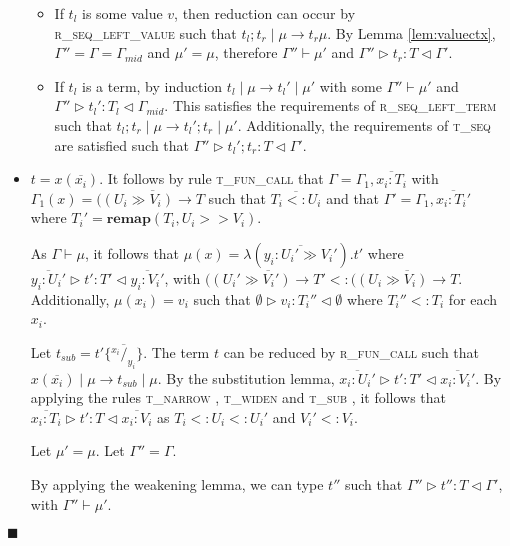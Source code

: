\documentclass{article}
\newcommand{\lemref}[1]{Lemma \ref{#1}}
\newcommand{\rseqlt}{\textsc{r\_seq\_left\_term} }
\newcommand{\rseqlv}{\textsc{r\_seq\_left\_value} }
\newcommand{\rfunc}{\textsc{r\_fun\_call} }
\newcommand{\tseq}{\textsc{t\_seq} }
\newcommand{\tfunc}{\textsc{t\_fun\_call} }
\newcommand{\tsub}{\textsc{t\_sub} }
\newcommand{\tnarrow}{\textsc{t\_narrow} }
\newcommand{\twiden}{\textsc{t\_widen} }
\newcommand{\typerule}[4]{#1 \triangleright #2 : #3 \triangleleft #4}
\newcommand{\subst}[3]{#3 \{\overline{^{#1}/_{#2}}\}}
\newcommand{\funv}[4]{\lambda(\overline{#1 : #2 \gg #3}).#4}
\newcommand{\funt}[3]{(\overline{(#1 \gg #2) \rightarrow #3}}
\newcommand{\qed}{$\blacksquare$}
\newenvironment{proof}{\vspace{1ex}\noindent{\bf Proof}\hspace{0.5em}}
  {\hfill\qed\vspace{1ex}}
\begin{document}
\begin{proof}
\begin{itemize}
	\begin{itemize}
	\item If $t_l$ is some value $v$, then
	reduction can occur by \\ 
	\rseqlv such that
	$t_l; t_r \mid \mu \longrightarrow t_r \mu$. By \lemref{lem:valuectx}, 
	$\Gamma'' = \Gamma = \Gamma_{mid}$
	and $\mu' = \mu$, therefore $\Gamma'' \vdash \mu'$ and 
	$\typerule{\Gamma''}{t_r}{T}{\Gamma'}$.

	\item If $t_l$ is a term, by induction $t_l \mid \mu \longrightarrow t_l' \mid \mu'$
	with some $\Gamma'' \vdash \mu'$ and
	$\typerule{\Gamma''}{t_l'}{T_l}{\Gamma_{mid}}$.
	This satisfies the requirements of \rseqlt
	such that $t_l; t_r \mid \mu \longrightarrow t_l'; t_r \mid \mu'$.
	Additionally, the requirements of \tseq are satisfied such that
	$\typerule{\Gamma''}{t_l'; t_r}{T}{\Gamma'}$.

	\end{itemize}

\item $t = x ( \overline{x_i} )$. It follows by rule \tfunc that
$\Gamma = \Gamma_1, \overline{x_i : T_i}$ 
with $\Gamma_1(x) = \funt{U_i}{V_i}{T}$
such that $\overline{T_i <: U_i}$ 
and that $\Gamma' = \Gamma_1, \overline{x_i : T_i'}$
where $T_i' = \mathbf{remap} ( T_i, U_i >> V_i )$.

As $\Gamma \vdash \mu$, 
it follows that $\mu(x) = \funv{y_i}{U_i'}{V_i'}{t'}$
where $\typerule{\overline{y_i : U_i'}}{t'}{T'}{\overline{y_i : V_i'}}$,
with $\funt{U_i'}{V_i'}{T'} <: \funt{U_i}{V_i}{T}$.
Additionally, $\mu(x_i) = v_i$ such that 
$\typerule{\emptyset}{v_i}{T_i''}{\emptyset}$ 
where $T_i'' <: T_i$ for each $x_i$.

Let $t_{sub} = \subst{x_i}{y_i}{t'}$.
The term $t$ can be reduced by \rfunc such that
$x ( \overline{x_i} ) \mid \mu \longrightarrow t_{sub} \mid \mu$.
By the substitution lemma, 
$\typerule{\overline{x_i : U_i'}}{t'}{T'}{\overline{x_i : V_i'}}$.
By applying the rules \tnarrow, \twiden and \tsub, it follows that
$\typerule{\overline{x_i : T_i}}{t'}{T}{\overline{x_i : V_i}}$
as $T_i <: U_i <: U_i'$ and $V_i' <: V_i$.


Let $\mu' = \mu$. Let $\Gamma'' = \Gamma$. 

By applying the weakening lemma, we can type $t''$ such that
$\typerule{\Gamma''}{t''}{T}{\Gamma'}$,
with $\Gamma'' \vdash \mu'$.


\end{itemize}
\end{proof}
\end{document}
